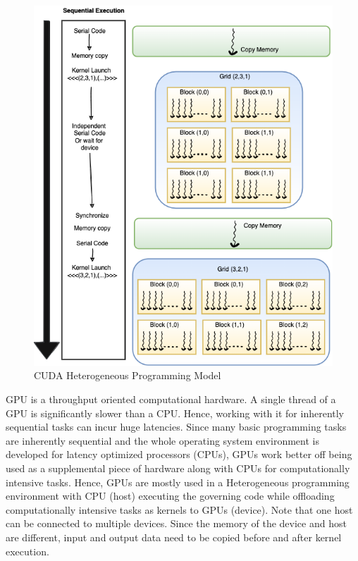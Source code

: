 \begin{figure}[ht]
\begin{minipage}{0.35\textwidth}
    \end{minipage}
    \begin{minipage}{0.6\textwidth}
        \includegraphics[width=\textwidth]{fig/heterogeneous-programming.png}
    \end{minipage}
    \caption{CUDA Heterogeneous Programming Model}
    \label{fig:Heterogenous-Programming}
\end{figure}
GPU is a throughput oriented computational hardware.
A single thread of a GPU is significantly slower than a CPU. Hence, working with it for inherently sequential tasks can incur huge latencies.
Since many basic programming tasks are inherently sequential and the whole operating system environment is developed for latency optimized processors (CPUs), GPUs work better off being used as a supplemental piece of hardware along with CPUs for computationally intensive tasks.
Hence, GPUs are mostly used in a Heterogeneous programming environment with CPU (host) executing the governing code while offloading computationally intensive tasks as kernels to GPUs (device).
Note that one host can be connected to multiple devices.
Since the memory of the device and host are different, input and output data need to be copied before and after kernel execution.
